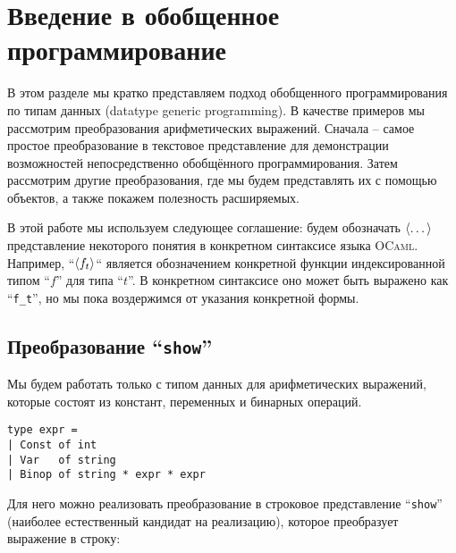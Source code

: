 \section{Введение в обобщенное программирование }
\label{sec:tutorial}

В этом разделе мы кратко представляем  подход обобщенного программирования по типам данных (datatype generic programming). В качестве примеров мы рассмотрим преобразования арифметических выражений.  Сначала -- самое простое преобразование в текстовое представление для демонстрации возможностей непосредственно обобщённого программирования. Затем рассмотрим другие преобразования, где мы будем представлять их с помощью объектов, а также покажем полезность расширяемых.



В этой работе мы используем следующее соглашение: будем обозначать $\left<\dots\right>$ представление некоторого понятия в конкретном синтаксисе языка \textsc{OCaml}. Например, ``$\left<f_t\right>$`` является обозначением конкретной функции индексированной типом  ``$f$'' для типа ``$t$''. 
В конкретном синтаксисе оно может быть выражено как ``\lstinline{f_t}'', но мы пока воздержимся от указания конкретной формы.


\subsection{Преобразование ``\texttt{show}''}

Мы будем работать только с типом данных для арифметических выражений, которые состоят из констант, переменных и бинарных операций.

\begin{lstlisting}
type expr =
| Const of int
| Var   of string
| Binop of string * expr * expr
\end{lstlisting}


Для него можно реализовать преобразование в строковое представление ``\lstinline{show}''
(наиболее естественный кандидат на реализацию),
которое преобразует выражение в строку: 

